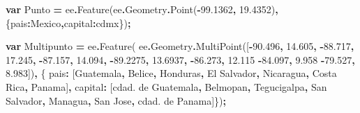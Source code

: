 \documentclass[
  12pt,
  letterpaper,
  twoside]{book}
\newenvironment{Shaded}{\begin{snugshade}}{\end{snugshade}}
\newcommand{\AttributeTok}[1]{\textcolor[rgb]{0.77,0.63,0.00}{#1}}
\newcommand{\DataTypeTok}[1]{\textcolor[rgb]{0.13,0.29,0.53}{#1}}
\newcommand{\FloatTok}[1]{\textcolor[rgb]{0.00,0.00,0.81}{#1}}
\newcommand{\FunctionTok}[1]{\textcolor[rgb]{0.00,0.00,0.00}{#1}}
\newcommand{\KeywordTok}[1]{\textcolor[rgb]{0.13,0.29,0.53}{\textbf{#1}}}
\newcommand{\NormalTok}[1]{#1}
\newcommand{\OperatorTok}[1]{\textcolor[rgb]{0.81,0.36,0.00}{\textbf{#1}}}
\newcommand{\StringTok}[1]{\textcolor[rgb]{0.31,0.60,0.02}{#1}}
\begin{document}
\begin{Shaded}
\begin{Highlighting}[]
\KeywordTok{var}\NormalTok{ Punto }\OperatorTok{=}\NormalTok{ ee}\OperatorTok{.}\FunctionTok{Feature}\NormalTok{(ee}\OperatorTok{.}\AttributeTok{Geometry}\OperatorTok{.}\FunctionTok{Point}\NormalTok{(}\OperatorTok{{-}}\FloatTok{99.1362}\OperatorTok{,} \FloatTok{19.4352}\NormalTok{)}\OperatorTok{,}
\NormalTok{    \{}\DataTypeTok{pais}\OperatorTok{:}\StringTok{\textquotesingle{}Mexico\textquotesingle{}}\OperatorTok{,}\DataTypeTok{capital}\OperatorTok{:}\StringTok{\textquotesingle{}cdmx\textquotesingle{}}\NormalTok{\})}\OperatorTok{;}

\KeywordTok{var}\NormalTok{ Multipunto }\OperatorTok{=}\NormalTok{ ee}\OperatorTok{.}\FunctionTok{Feature}\NormalTok{(}
\NormalTok{ee}\OperatorTok{.}\AttributeTok{Geometry}\OperatorTok{.}\FunctionTok{MultiPoint}\NormalTok{([}\OperatorTok{{-}}\FloatTok{90.496}\OperatorTok{,} \FloatTok{14.605}\OperatorTok{,}                               
                        \OperatorTok{{-}}\FloatTok{88.717}\OperatorTok{,} \FloatTok{17.245}\OperatorTok{,}                              
                        \OperatorTok{{-}}\FloatTok{87.157}\OperatorTok{,} \FloatTok{14.094}\OperatorTok{,}
                        \OperatorTok{{-}}\FloatTok{89.2275}\OperatorTok{,} \FloatTok{13.6937}\OperatorTok{,}
                        \OperatorTok{{-}}\FloatTok{86.273}\OperatorTok{,} \FloatTok{12.115}
                        \OperatorTok{{-}}\FloatTok{84.097}\OperatorTok{,} \FloatTok{9.958}
                        \OperatorTok{{-}}\FloatTok{79.527}\OperatorTok{,} \FloatTok{8.983}\NormalTok{])}\OperatorTok{,}
\NormalTok{    \{ }\DataTypeTok{pais}\OperatorTok{:}\NormalTok{ [}\StringTok{\textquotesingle{}Guatemala\textquotesingle{}}\OperatorTok{,} 
        \StringTok{\textquotesingle{}Belice\textquotesingle{}}\OperatorTok{,} 
        \StringTok{\textquotesingle{}Honduras\textquotesingle{}}\OperatorTok{,} 
        \StringTok{\textquotesingle{}El Salvador\textquotesingle{}}\OperatorTok{,} 
        \StringTok{\textquotesingle{}Nicaragua\textquotesingle{}}\OperatorTok{,} 
        \StringTok{\textquotesingle{}Costa Rica\textquotesingle{}}\OperatorTok{,} 
        \StringTok{\textquotesingle{}Panama\textquotesingle{}}\NormalTok{]}\OperatorTok{,}
      \DataTypeTok{capital}\OperatorTok{:}\NormalTok{  [}\StringTok{\textquotesingle{}cdad. de Guatemala\textquotesingle{}}\OperatorTok{,} 
            \StringTok{\textquotesingle{}Belmopan\textquotesingle{}}\OperatorTok{,} 
            \StringTok{\textquotesingle{}Tegucigalpa\textquotesingle{}}\OperatorTok{,} 
            \StringTok{\textquotesingle{}San Salvador\textquotesingle{}}\OperatorTok{,} 
            \StringTok{\textquotesingle{}Managua\textquotesingle{}}\OperatorTok{,} 
            \StringTok{\textquotesingle{}San Jose\textquotesingle{}}\OperatorTok{,} 
            \StringTok{\textquotesingle{}cdad. de Panama\textquotesingle{}}\NormalTok{]\})}\OperatorTok{;}


\end{Highlighting}
\end{Shaded}
\end{document}
